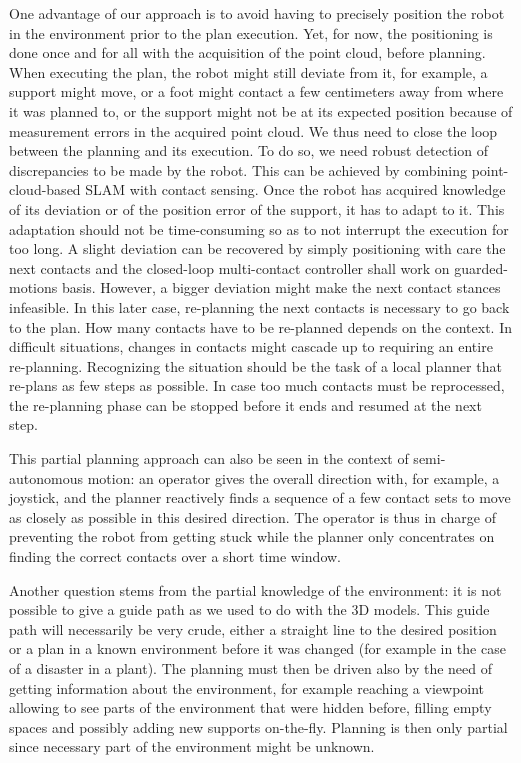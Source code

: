 One advantage of our approach is to avoid having to precisely position the robot in the environment prior to the plan execution.
Yet, for now, the positioning is done once and for all with the acquisition of the point cloud, before planning.
When executing the plan, the robot might still deviate from it, for example, a support might move, or a foot might contact a few centimeters away from where it was planned to, or the support might not be at its expected position because of measurement errors in the acquired point cloud.
We thus need to close the loop between the planning and its execution.
To do so, we need robust detection of discrepancies to be made by the robot.
This can be achieved by combining point-cloud-based SLAM with contact sensing.
Once the robot has acquired knowledge of its deviation or of the position error of the support, it has to adapt to it.
This adaptation should not be time-consuming so as to not interrupt the execution for too long.
A slight deviation can be recovered by simply positioning with care the next contacts and the closed-loop multi-contact controller shall work on guarded-motions basis.
However, a bigger deviation might make the next contact stances infeasible.
In this later case, re-planning the next contacts is necessary to go back to the plan.
How many contacts have to be re-planned depends on the context.
In difficult situations, changes in contacts might cascade up to requiring an entire re-planning.
Recognizing the situation should be the task of a local planner that re-plans as few steps as possible.
In case too much contacts must be reprocessed, the re-planning phase can be stopped before it ends and resumed at the next step.

This partial planning approach can also be seen in the context of semi-autonomous motion: an operator gives the overall direction with, for example, a joystick, and the planner reactively finds a sequence of a few contact sets to move as closely as possible in this desired direction.
The operator is thus in charge of preventing the robot from getting stuck while the planner only concentrates on finding the correct contacts over a short time window.

Another question stems from the partial knowledge of the environment: it is not possible to give a guide path as we used to do with the 3D models.
This guide path will necessarily be very crude, either a straight line to the desired position or a plan in a known environment before it was changed (for example in the case of a disaster in a plant).
The planning must then be driven also by the need of getting information about the environment, for example reaching a viewpoint allowing to see parts of the environment that were hidden before, filling empty spaces and possibly adding new supports on-the-fly.
Planning is then only partial since necessary part of the environment might be unknown.

